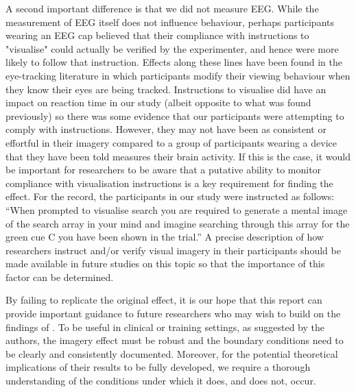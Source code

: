 \documentclass[smallextended]{svjour3}       %
\begin{document}
A second important difference is that we did not measure EEG. While the measurement of EEG itself does not influence behaviour, perhaps participants wearing an EEG cap believed that their compliance with instructions to "visualise" could actually be verified by the experimenter, and hence were more likely to follow that instruction. Effects along these lines have been found in the eye-tracking literature \citep{nasiopoulos2015} in which participants modify their viewing behaviour when they know their eyes are being tracked. Instructions to visualise did have an impact on reaction time in our study (albeit opposite to what was found previously) so there was some evidence that our participants were attempting to comply with instructions. However, they may not have been as consistent or effortful in their imagery compared to a group of participants wearing a device that they have been told measures their brain activity. If this is the case, it would be important for researchers to be aware that a putative ability to monitor compliance with visualisation instructions is a key requirement for finding the effect. For the record, the participants in our study were instructed as follows: ``When prompted to visualise search you are required to generate a mental image of the search array in your mind and imagine searching through this array for the green cue C you have been shown in the trial.'' A precise description of how researchers instruct and/or verify visual imagery in their participants should be made available in future studies on this topic so that the importance of this factor can be determined.

By failing to replicate the original effect, it is our hope that this report can provide important guidance to future researchers who may wish to build on the findings of  \cite{reinhart2015}. To be useful in clinical or training settings, as suggested by the authors, the imagery effect must be robust and the boundary conditions need to be clearly and consistently documented. Moreover, for the potential theoretical implications of their results to be fully developed, we require a thorough understanding of the conditions under which it does, and does not, occur.




\end{document}
